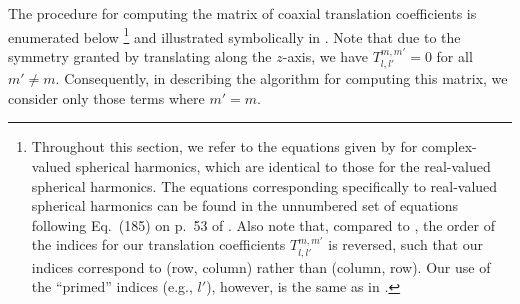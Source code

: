 The procedure for computing the matrix of coaxial translation coefficients is enumerated below%
\footnote{Throughout this section, we refer to the equations given by \citet{Zotter2009PhD} for complex-valued spherical harmonics, which are identical to those for the real-valued spherical harmonics.
The equations corresponding specifically to real-valued spherical harmonics can be found in the unnumbered set of equations following Eq.~(185) on p.~53 of \citet{Zotter2009PhD}.
Also note that, compared to \citet{Zotter2009PhD}, the order of the indices for our translation coefficients $T_{l,l'}^{m,m'}$ is reversed, such that our indices correspond to (row, column) rather than (column, row).
Our use of the ``primed'' indices (e.g., $l'$), however, is the same as in \citet{Zotter2009PhD}.}
and illustrated symbolically in .
Note that due to the symmetry granted by translating along the $z$-axis, we have $T_{l,l'}^{m,m'} = 0$ for all $m' \neq m$.
Consequently, in describing the algorithm for computing this matrix, we consider only those terms where $m' = m$.

